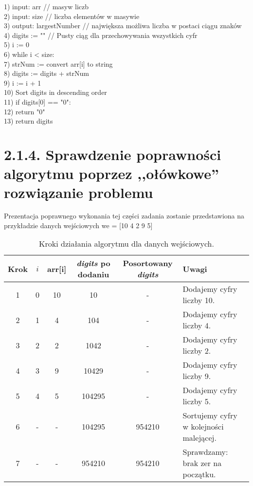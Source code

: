 \documentclass[a4paper,12pt]{article}
\begin{document}
	1) input: arr // masyw liczb \\
	2) input: size // liczba elementów w masywie \\
	3) output: largestNumber // największa możliwa liczba w postaci ciągu znaków \\
	4) digits := "" // Pusty ciąg dla przechowywania wszystkich cyfr \\
	5) i := 0 \\
	6) while i < size: \\
	7) \hspace{1cm} strNum := convert arr[i] to string \\
	8) \hspace{1cm} digits := digits + strNum \\
	9) \hspace{1cm} i := i + 1 \\
	10) Sort digits in descending order \\
	11) if digits[0] == "0": \\
	12) \hspace{1cm} return "0" \\
	13) return digits
	\section{2.1.4. Sprawdzenie poprawności algorytmu poprzez ,,ołówkowe” rozwiązanie problemu}
	Prezentacja poprawnego wykonania tej części zadania zostanie przedstawiona na przykładzie danych wejściowych
	we = [10 4 2 9 5]
	
	\begin{table}[h!]
		\centering
		\begin{tabular}{|c|c|c|c|c|p{4cm}|}
			\hline
			\textbf{Krok} & \textbf{$i$} & \textbf{arr[i]} & \textbf{\textit{digits} po dodaniu} & \textbf{Posortowany \textit{digits}} & \textbf{Uwagi} \\
			\hline
			1 & 0 & 10 & 10 & - & Dodajemy cyfry liczby 10. \\
			\hline
			2 & 1 & 4 & 104 & - & Dodajemy cyfry liczby 4. \\
			\hline
			3 & 2 & 2 & 1042 & - & Dodajemy cyfry liczby 2. \\
			\hline
			4 & 3 & 9 & 10429 & - & Dodajemy cyfry liczby 9. \\
			\hline
			5 & 4 & 5 & 104295 & - & Dodajemy cyfry liczby 5. \\
			\hline
			6 & - & - & 104295 & 954210 & Sortujemy cyfry w kolejności malejącej. \\
			\hline
			7 & - & - & 954210 & 954210 & Sprawdzamy: brak zer na początku. \\
			\hline
		\end{tabular}
		\caption{Kroki działania algorytmu dla danych wejściowych.}
	\end{table}
	\newpage
\end{document}

